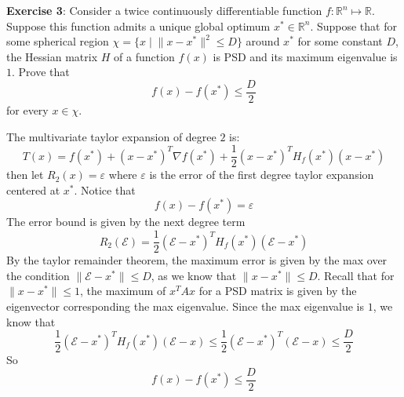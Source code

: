 \documentclass{article}
\begin{document}
    \textbf{Exercise 3}: Consider a twice continuously differentiable function $f: \mathbb{R}^{n} \mapsto \mathbb{R}$. Suppose this function admits a unique global optimum $x^{*} \in \mathbb{R}^{n}$. Suppose that for some spherical region $\chi = \{x \mid \lVert x - x^{*} \rVert^{2} \leq D\}$ around $x^{*}$ for some constant $D$, the Hessian matrix $H$ of a function $f(x)$ is PSD and its maximum eigenvalue is $1$. Prove that
        \begin{equation*}
            f(x) - f(x^{*}) \leq \dfrac{D}{2}
        \end{equation*}
    for every $x \in \chi$.
        \begin{answer}
            The multivariate taylor expansion of degree $2$ is:
                \begin{equation*}
                    T(x) = f(x^{*}) + (x - x^{*})^{T}\nabla f(x^{*}) + \dfrac{1}{2}(x - x^{*})^{T} H_{f}(x^{*})(x - x^{*})
                \end{equation*}
            then let $R_{2}(x) = \varepsilon$ where $\varepsilon$ is the error of the first degree taylor expansion centered at $x^{*}$. Notice that
                \begin{equation*}
                    f(x) - f(x^{*}) = \varepsilon
                \end{equation*}
            The error bound is given by the next degree term
                \begin{equation*}
                    R_{2}(\mathcal{E}) = \dfrac{1}{2}(\mathcal{E} - x^{*})^{T}H_{f}(x^{*})(\mathcal{E} - x^{*})
                \end{equation*}
            By the taylor remainder theorem, the maximum error is given by the max over the condition $\lVert \mathcal{E} - x^{*} \rVert \leq D$, as we know that $\lVert x - x^{*} \rVert \leq D$. Recall that for $\lVert x - x^{*} \rVert \leq 1$, the maximum of $x^{T}Ax$ for a PSD matrix is given by the eigenvector corresponding the max eigenvalue. Since the max eigenvalue is $1$, we know that
                \begin{equation*}
                    \dfrac{1}{2}(\mathcal{E} - x^{*})^{T}H_{f}(x^{*})(\mathcal{E} - x) \leq \dfrac{1}{2} (\mathcal{E} - x^{*})^{T}(\mathcal{E} - x) \leq \dfrac{D}{2}
                \end{equation*}
            So
                \begin{equation*}
                    f(x) - f(x^{*}) \leq \dfrac{D}{2}
                \end{equation*}
        \end{answer}
\end{document}
